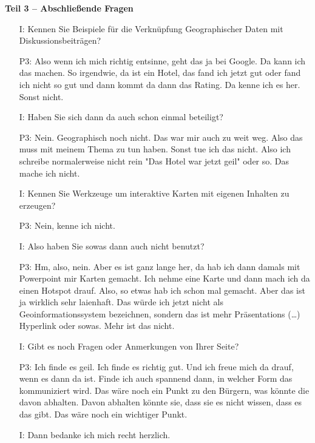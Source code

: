 \textbf{Teil 3 -- Abschlie{\ss}ende Fragen}
\begin{itemize}
    \item[I:] Kennen Sie Beispiele f{\"u}r die Verkn{\"u}pfung Geographischer Daten mit Diskussionsbeitr{\"a}gen?
    \item[P3:] Also wenn ich mich richtig entsinne, geht das ja bei Google. Da kann ich das machen. So irgendwie, da ist ein Hotel, das fand ich jetzt gut oder fand ich nicht so gut und dann kommt da dann das Rating. Da kenne ich es her. Sonst nicht.
    \item[I:] Haben Sie sich dann da auch schon einmal beteiligt?
    \item[P3:] Nein. Geographisch noch nicht. Das war mir auch zu weit weg. Also das muss mit meinem Thema zu tun haben. Sonst tue ich das nicht. Also ich schreibe normalerweise nicht rein "Das Hotel war jetzt geil" oder so. Das mache ich nicht.
    \item[I:] Kennen Sie Werkzeuge um interaktive Karten mit eigenen Inhalten zu erzeugen?
    \item[P3:] Nein, kenne ich nicht.
    \item[I:] Also haben Sie sowas dann auch nicht benutzt?
    \item[P3:] Hm, also, nein. Aber es ist ganz lange her, da hab ich dann damals mit Powerpoint mir Karten gemacht. Ich nehme eine Karte und dann mach ich da einen Hotspot drauf. Also, so etwas hab ich schon mal gemacht. Aber das ist ja wirklich sehr laienhaft. Das w{\"u}rde ich jetzt nicht als Geoinformationssystem bezeichnen, sondern das ist mehr Pr{\"a}sentations (\dots) Hyperlink oder sowas. Mehr ist das nicht.
    \item[I:] Gibt es noch Fragen oder Anmerkungen von Ihrer Seite?
    \item[P3:] Ich finde es geil. Ich finde es richtig gut. Und ich freue mich da drauf, wenn es dann da ist. Finde ich auch spannend dann, in welcher Form das kommuniziert wird. Das w{\"a}re noch ein Punkt zu den B{\"u}rgern, was k{\"o}nnte die davon abhalten. Davon abhalten k{\"o}nnte sie, dass sie es nicht wissen, dass es das gibt. Das w{\"a}re noch ein wichtiger Punkt.
    \item[I:] Dann bedanke ich mich recht herzlich.
\end{itemize}
